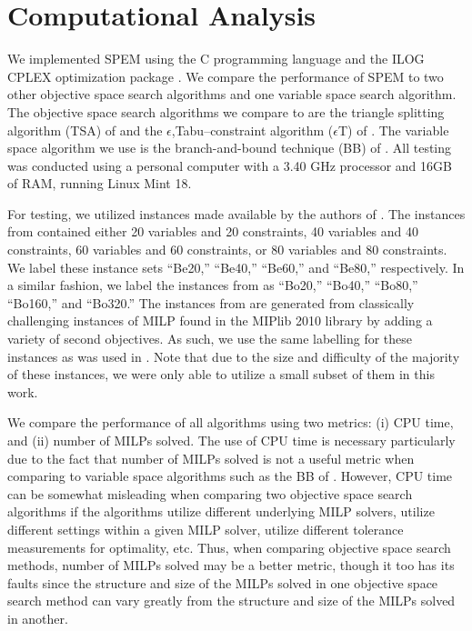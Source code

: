 \documentclass[12pt]{article}
\begin{document}
\section{Computational Analysis} \label{sec:compute}
We implemented SPEM using the C programming language and the ILOG CPLEX optimization package \citep{cplex126}.  We compare the performance of SPEM to two other objective space search algorithms and one variable space search algorithm. The objective space search algorithms we compare to are the triangle splitting algorithm (TSA) of \citet{boland2015criterion} and the $\epsilon$,Tabu--constraint algorithm ($\epsilon$T) of \citet{soylu2016exact}. The variable space algorithm we use is the branch-and-bound technique (BB) of \citet{adelgren2016}. All testing was conducted using a personal computer with a 3.40 GHz processor and 16GB of RAM, running Linux Mint 18.%

For testing, we utilized instances made available by the authors of  \citep{adelgren2016,belotti2012biobjective,boland2015criterion}. The instances from \citep{belotti2012biobjective} contained either 20 variables and 20 constraints, 40 variables and 40 constraints, 60 variables and 60 constraints, or 80 variables and 80 constraints. We label these instance sets ``Be20,'' ``Be40,'' ``Be60,'' and ``Be80,'' respectively. In a similar fashion, we label the instances from \citep{boland2015criterion} as ``Bo20,'' ``Bo40,'' ``Bo80,'' ``Bo160,'' and ``Bo320.'' The instances from \citep{adelgren2016} are generated from classically challenging instances of MILP found in the MIPlib 2010 library \citep{KochEtAl2011} by adding a variety of second objectives. As such, we use the same labelling for these instances as was used in \citep{adelgren2016}. Note that due to the size and difficulty of the majority of these instances, we were only able to utilize a small subset of them in this work.

We compare the performance of all algorithms using two metrics: (i) CPU time, and (ii) number of MILPs solved. The use of CPU time is necessary particularly due to the fact that number of MILPs solved is not a useful metric when comparing to variable space algorithms such as the BB of \citet{adelgren2016}. However, CPU time can be somewhat misleading when comparing two objective space search algorithms if the algorithms utilize different underlying MILP solvers, utilize different settings within a given MILP solver, utilize different tolerance measurements for optimality, etc. Thus, when comparing objective space search methods, number of MILPs solved may be a better metric, though it too has its faults since the structure and size of the MILPs solved in one objective space search method can vary greatly from the structure and size of the MILPs solved in another.
\end{document}
